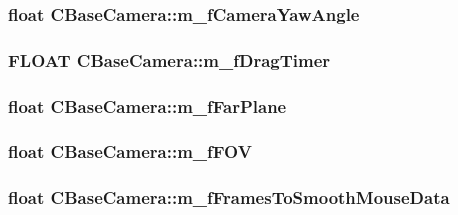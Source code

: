\hypertarget{class_c_base_camera_afe69549c26475e5d4f577cf8d2dce8cb}{
\subsubsection[{m\_\-fCameraYawAngle}]{\setlength{\rightskip}{0pt plus 5cm}float {\bf CBaseCamera::m\_\-fCameraYawAngle}}}
\label{class_c_base_camera_afe69549c26475e5d4f577cf8d2dce8cb}
\hypertarget{class_c_base_camera_aae76e8c993f56e6b21fa64b3bf0ee58a}{
\subsubsection[{m\_\-fDragTimer}]{\setlength{\rightskip}{0pt plus 5cm}FLOAT {\bf CBaseCamera::m\_\-fDragTimer}}}
\label{class_c_base_camera_aae76e8c993f56e6b21fa64b3bf0ee58a}
\hypertarget{class_c_base_camera_a667fbeae2b0445a30819109cd745764a}{
\subsubsection[{m\_\-fFarPlane}]{\setlength{\rightskip}{0pt plus 5cm}float {\bf CBaseCamera::m\_\-fFarPlane}}}
\label{class_c_base_camera_a667fbeae2b0445a30819109cd745764a}
\hypertarget{class_c_base_camera_ad480f1dc8ae654fc126cc2dfb57a1ec0}{
\subsubsection[{m\_\-fFOV}]{\setlength{\rightskip}{0pt plus 5cm}float {\bf CBaseCamera::m\_\-fFOV}}}
\label{class_c_base_camera_ad480f1dc8ae654fc126cc2dfb57a1ec0}
\hypertarget{class_c_base_camera_af9b4d43933754929e66403e0435d6387}{
\subsubsection[{m\_\-fFramesToSmoothMouseData}]{\setlength{\rightskip}{0pt plus 5cm}float {\bf CBaseCamera::m\_\-fFramesToSmoothMouseData}}}
